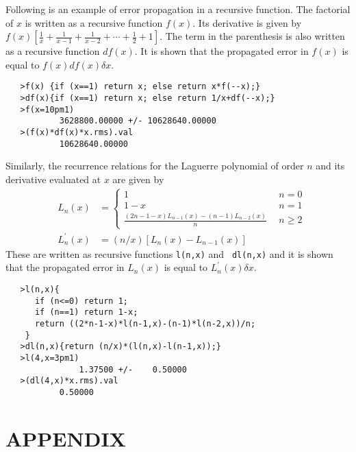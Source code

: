 \documentclass[11pt]{article}
\begin{document}
Following is an example of error propagation in a recursive function.
The factorial of $x$ is written as a recursive function $f(x)$.  Its
derivative is given by 
$f(x)\left[\frac{1}{x} + \frac{1}{x-1} + \frac{1}{x-2} +\cdots +
\frac{1}{2} + 1\right]$.  The term in the parenthesis is also written
as a recursive function $df(x)$.  It is shown that the propagated
error in $f(x)$ is equal to $f(x)df(x)\delta x$.
\begin{verbatim}
   >f(x) {if (x==1) return x; else return x*f(--x);}
   >df(x){if (x==1) return x; else return 1/x+df(--x);}
   >f(x=10pm1)
           3628800.00000 +/- 10628640.00000
   >(f(x)*df(x)*x.rms).val
           10628640.00000
\end{verbatim}
Similarly, the recurrence relations for the Laguerre polynomial of
order $n$ and its derivative evaluated at $x$ are given by
\begin{eqnarray}
&L_n(x)& = \left\{
	\begin{array}{lr}
	1&~~n=0\\
	1-x&~~n=1\\
	\frac{\left(2n-1-x\right)L_{n-1}(x)-\left(n-1\right)L_{n-2}(x)}{n}&~~n\ge2
	\end{array}
	\right. \\
&L^\prime_n(x)&  = \left(n/x\right)\left[L_n(x) - L_{n-1}(x)\right]
\end{eqnarray}
These are written as recursive functions {\tt l(n,x)} and {\tt
dl(n,x)} and it is shown that the propagated error in $L_n(x)$ is
equal to $L^\prime_n(x)\delta x$.
\begin{verbatim}
   >l(n,x){
      if (n<=0) return 1;
      if (n==1) return 1-x;
      return ((2*n-1-x)*l(n-1,x)-(n-1)*l(n-2,x))/n;
    }
   >dl(n,x){return (n/x)*(l(n,x)-l(n-1,x));}
   >l(4,x=3pm1)
               1.37500 +/-    0.50000
   >(dl(4,x)*x.rms).val
           0.50000
\end{verbatim}

\appendix       
\section*{APPENDIX}
\end{document}

